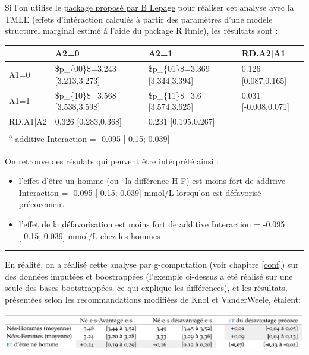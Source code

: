 \documentclass[
]{book}
\providecommand{\tightlist}{%
  \setlength{\itemsep}{0pt}\setlength{\parskip}{0pt}}
\begin{document}
Si l'on utilise le \href{https://github.com/benoitlepage/MargIntTmle}{package proposé par B Lepage} pour réaliser cet analyse avec la TMLE (effets d'intéraction calculés à partir des paramètres d'une modèle structurel marginal estimé à l'aide du package R ltmle), les résultats sont :

\begin{table}
\centering
\begin{tabular}{l|l|l|l}
\hline
  & A2=0 & A2=1 & RD.A2|A1\\
\hline
A1=0 & \$p\_\{00\}\$=3.243 [3.213,3.273] & \$p\_\{01\}\$=3.369 [3.344,3.394] & 0.126 [0.087,0.165]\\
\hline
A1=1 & \$p\_\{10\}\$=3.568 [3.538,3.598] & \$p\_\{11\}\$=3.6 [3.574,3.625] & 0.031 [-0.008,0.071]\\
\hline
RD.A1|A2 & 0.326 [0.283,0.368] & 0.231 [0.195,0.267] & \\
\hline
\multicolumn{4}{l}{\textsuperscript{a} additive Interaction = -0.095 [-0.15;-0.039]}\\
\end{tabular}
\end{table}

On retrouve des résulats qui peuvent être intérprété ainsi :

\begin{itemize}
\tightlist
\item
  l'effet d'être un homme (ou ``la différence H-F) est moins fort de additive Interaction = -0.095 {[}-0.15;-0.039{]} mmol/L lorsqu'on est défavorisé précocement
\item
  l'effet de la défavorisation est moins fort de additive Interaction = -0.095 {[}-0.15;-0.039{]} mmol/L chez les hommes
\end{itemize}

\begin{center}\rule{0.5\linewidth}{0.5pt}\end{center}

En réalité, on a réalisé cette analyse par g-computation (voir chapitre \ref{conf}) sur des données imputées et boostrappées (l'exemple ci-dessus a été réalisé sur une seule des bases bootstrappées, ce qui explique les différences), et les résultats, présentées selon les recommandations modifiées de Knol et VanderWeele, étaient:

\includegraphics[width=1\textwidth,height=\textheight]{img/result_quanti.png}
\end{document}
